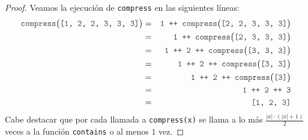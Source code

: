 \documentclass{article}
\newcommand{\code}[1]{\textcolor{white!25!black}{\texttt{#1}}}
\begin{document}
\begin{proof} Veamos la ejecución de \code{compress} en las siguientes líneas:
  \begin{eqnarray*}
    \code{compress}\big(\code{[1, 2, 2, 3, 3, 3]}\big)
    &=& \code{1 ++ compress}\big(\code{[2, 2, 3, 3, 3]}\big)\\
    &=& \code{1 ++ compress}\big(\code{[2, 3, 3, 3]}\big)\\
    &=& \code{1 ++ 2 ++ compress}\big(\code{[3, 3, 3]}\big)\\
    &=& \code{1 ++ 2 ++ compress}\big(\code{[3, 3]}\big)\\
    &=& \code{1 ++ 2 ++ compress}\big(\code{[3]}\big)\\
    &=& \code{1 ++ 2 ++ 3}\\
    &=& \code{[1, 2, 3]}
  \end{eqnarray*}
  Cabe destacar que por cada llamada a \code{compress(x)} se llama a lo más
  $\frac{|x| \cdot (|x| + 1)}{2}$ veces a la función \code{contains} o al menos $1$ vez.
\end{proof}
\end{document}
